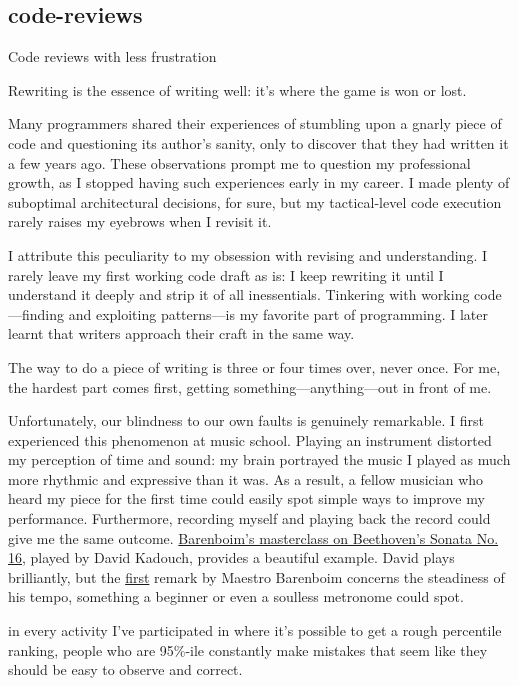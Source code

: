 \documentclass{article}
\begin{document}
\subsection{code-reviews}{Code reviews with less frustration}
\epigraph{
  Rewriting is the essence of writing well: it’s where the game is won or lost.
}{}

Many programmers shared their experiences of stumbling upon a gnarly piece of code and questioning its author's sanity,
only to discover that they had written it a few years ago.
These observations prompt me to question my professional growth, as I stopped having such experiences early in my career.
I made plenty of suboptimal architectural decisions, for sure, but my tactical-level code execution rarely raises my eyebrows when I revisit it.

I attribute this peculiarity to my obsession with revising and understanding.
I rarely leave my first working code draft as is: I keep rewriting it until I understand it deeply and strip it of all inessentials.
Tinkering with working code—finding and exploiting patterns—is my favorite part of programming.
I later learnt that writers approach their craft in the same way.

\epigraph{
  The way to do a piece of writing is three or four times over, never once. For me, the hardest part comes first, getting something—anything—out in front of me.
}{}

Unfortunately, our blindness to our own faults is genuinely remarkable.
I first experienced this phenomenon at music school.
Playing an instrument distorted my perception of time and sound: my brain portrayed the music I played as much more rhythmic and expressive than it was.
As a result, a fellow musician who heard my piece for the first time could easily spot simple ways to improve my performance.
Furthermore, recording myself and playing back the record could give me the same outcome.
\href{https://youtu.be/CwebNT9AMiA?si=_2BljVfI_ArgxRrF}{Barenboim’s masterclass on Beethoven's Sonata No. 16}, played by David Kadouch, provides a beautiful example.
David plays brilliantly, but the \href{https://youtu.be/CwebNT9AMiA?si=bUYR5Vswf-44dpik&t=480}{first} remark by Maestro Barenboim concerns the steadiness of his tempo,
something a beginner or even a soulless metronome could spot.

\epigraph{
in every activity I've participated in where it's possible to get a rough percentile ranking, people who are 95\%-ile constantly make mistakes that seem like they should be easy to observe and correct.
}{}
\end{document}
